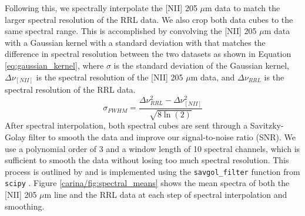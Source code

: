 Following this, we spectrally interpolate the [NII] 205 $\mu$m data to match the larger spectral resolution of the RRL data.
We also crop both data cubes to the same spectral range. 
This is accomplished by convolving the [NII] 205 $\mu$m data with a Gaussian kernel with a standard deviation with that matches the difference in spectral resolution between the two datasets as shown in Equation \ref{eq:gaussian_kernel}, where $\sigma$ is the standard deviation of the Gaussian kernel, $\Delta \nu_{[NII]}$ is the spectral resolution of the [NII] 205 $\mu$m data, and $\Delta \nu_{RRL}$ is the spectral resolution of the RRL data.
\begin{equation}
    \sigma_{FWHM} = \frac{\Delta \nu_{RRL}^2 - \Delta \nu_{[NII]}^2}{\sqrt{8\ln(2)}}
    \label{eq:gaussian_kernel}
\end{equation}
After spectral interpolation, both spectral cubes are sent through a Savitzky-Golay filter to smooth the data and improve our signal-to-noise ratio (SNR). 
We use a polynomial order of 3 and a window length of 10 spectral channels, which is sufficient to smooth the data without losing too much spectral resolution. 
This process is outlined by \cite{pineda2019electron} and is implemented using the \texttt{savgol\_filter} function from \texttt{scipy} \parencite{2020SciPy-NMeth}.
Figure \ref{carina/fig:spectral_means} shows the mean spectra of both the [NII] 205 $\mu$m line and the RRL data at each step of spectral interpolation and smoothing.


